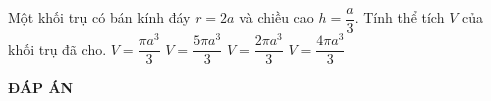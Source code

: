 \begin{ex}%
	Một khối trụ có bán kính đáy $r=2a$ và chiều cao $h=\dfrac{a}{3}$. Tính thể tích $V$ của khối trụ đã cho.
	\choice
	{$V=\dfrac{\pi a^3}{3}$}
	{$V=\dfrac{5\pi a^3}{3}$}
	{$V=\dfrac{2\pi a^3}{3}$}
	{\True $V=\dfrac{4\pi a^3}{3}$}
\end{ex}
\newpage
\begin{center}
	\textbf{ĐÁP ÁN}
\end{center}
\begin{multicols}{10}
	 
\end{multicols}


